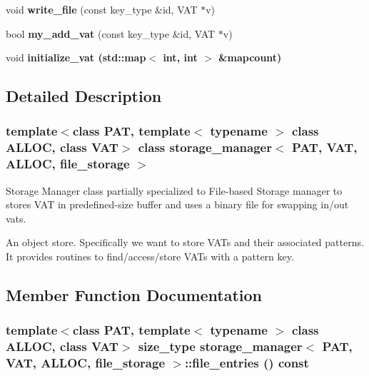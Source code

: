 \begin{CompactItemize}
\item 
void \textbf{write\_\-file} (const key\_\-type \&id, VAT $\ast$v)\label{classstorage__manager_3_01PAT_00_01VAT_00_01ALLOC_00_01file__storage_01_4_8336dbfbeb805f29f7d5846a4f33658f}

\item 
bool \textbf{my\_\-add\_\-vat} (const key\_\-type \&id, VAT $\ast$v)\label{classstorage__manager_3_01PAT_00_01VAT_00_01ALLOC_00_01file__storage_01_4_c7e0fc6c3129d46b3626c761aecf5fd6}

\item 
void \bf{initialize\_\-vat} (std::map$<$ int, int $>$ \&mapcount)
\end{CompactItemize}


\subsection{Detailed Description}
\subsubsection*{template$<$class PAT, template$<$ typename $>$ class ALLOC, class VAT$>$ class storage\_\-manager$<$ PAT, VAT, ALLOC, file\_\-storage $>$}

Storage Manager class partially specialized to File-based Storage manager to stores VAT in predefined-size buffer and uses a binary file for swapping in/out vats. 

An object store. Specifically we want to store VATs and their associated patterns. It provides routines to find/access/store VATs with a pattern key. 



\subsection{Member Function Documentation}
\subsubsection{\setlength{\rightskip}{0pt plus 5cm}template$<$class PAT, template$<$ typename $>$ class ALLOC, class VAT$>$ size\_\-type \bf{storage\_\-manager}$<$ PAT, VAT, ALLOC, \bf{file\_\-storage} $>$::file\_\-entries () const\hspace{0.3cm}{\tt  [inline]}}\label{classstorage__manager_3_01PAT_00_01VAT_00_01ALLOC_00_01file__storage_01_4_b3b3bafb049675144492b7a6ad7e3f05}


